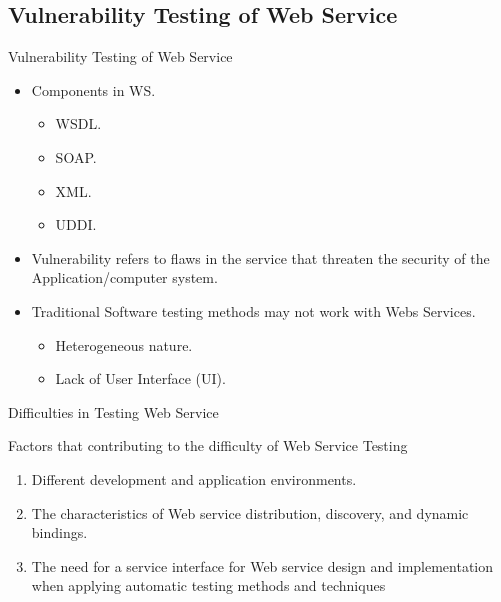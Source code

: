 \documentclass{bredelebeamer}
\begin{document}
\subsection{Vulnerability Testing of Web Service}
\begin{frame}{Vulnerability Testing of Web Service}
	\large
	\begin{itemize}
		\item Components in WS.
		\newline
		\begin{itemize}
			\large
			\item WSDL.
			\item SOAP.
			\item XML.
			\item UDDI.
			\newline
			\pause
		\end{itemize}
	
		\item Vulnerability refers to flaws in the service that threaten the security of
		the Application/computer system.
		\newline
		\item Traditional Software testing methods may not work with Webs Services. 
		\begin{itemize}
			\large
			\item Heterogeneous nature. 
			\item Lack of User Interface (UI).
		\end{itemize}
	\end{itemize}
\end{frame}
\begin{frame}{Difficulties in Testing Web Service}
	\large
	

	\begin{block}{Factors that contributing to
			the difficulty of Web Service Testing}
	\begin{enumerate}
		\large
		\item Different development and application environments.
		\newline
		\item The characteristics of Web service distribution, discovery, and dynamic bindings.
		\newline
		\item The need for a service interface for Web service design and implementation when
		applying automatic testing methods and techniques
	\end{enumerate}
	\end{block}
\end{frame}
\end{document}
